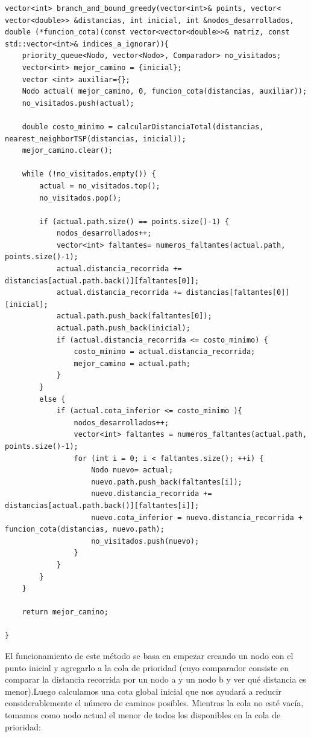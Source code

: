 \documentclass[11pt,openany]{book}
\begin{document}
\begin{lstlisting}
vector<int> branch_and_bound_greedy(vector<int>& points, vector< vector<double>> &distancias, int inicial, int &nodos_desarrollados, 
double (*funcion_cota)(const vector<vector<double>>& matriz, const std::vector<int>& indices_a_ignorar)){
    priority_queue<Nodo, vector<Nodo>, Comparador> no_visitados;
    vector<int> mejor_camino = {inicial};
    vector <int> auxiliar={};
    Nodo actual( mejor_camino, 0, funcion_cota(distancias, auxiliar));
    no_visitados.push(actual);

    double costo_minimo = calcularDistanciaTotal(distancias, nearest_neighborTSP(distancias, inicial));
    mejor_camino.clear();

    while (!no_visitados.empty()) {
        actual = no_visitados.top();
        no_visitados.pop();

        if (actual.path.size() == points.size()-1) {
            nodos_desarrollados++;
            vector<int> faltantes= numeros_faltantes(actual.path, points.size()-1);
            actual.distancia_recorrida += distancias[actual.path.back()][faltantes[0]];
            actual.distancia_recorrida += distancias[faltantes[0]][inicial];
            actual.path.push_back(faltantes[0]);
            actual.path.push_back(inicial);
            if (actual.distancia_recorrida <= costo_minimo) {
                costo_minimo = actual.distancia_recorrida;
                mejor_camino = actual.path;
            }
        } 
        else { 
            if (actual.cota_inferior <= costo_minimo ){
                nodos_desarrollados++;
                vector<int> faltantes = numeros_faltantes(actual.path, points.size()-1);
                for (int i = 0; i < faltantes.size(); ++i) {
                    Nodo nuevo= actual;
                    nuevo.path.push_back(faltantes[i]);
                    nuevo.distancia_recorrida += distancias[actual.path.back()][faltantes[i]];
                    nuevo.cota_inferior = nuevo.distancia_recorrida + funcion_cota(distancias, nuevo.path);
                    no_visitados.push(nuevo);
                }
            }
        }
    }

    return mejor_camino;

}
\end{lstlisting}

El funcionamiento de este método se basa en empezar creando un nodo con el punto inicial y agregarlo a la cola de prioridad (cuyo comparador
consiste en comparar la distancia recorrida por un nodo a y un nodo b y ver qué distancia es menor).Luego calculamos una cota global inicial que nos ayudará
a reducir considerablemente el número de caminos posibles. Mientras la cola no esté vacía, tomamos como nodo actual el menor de todos los disponibles en la cola de prioridad:
\end{document}
